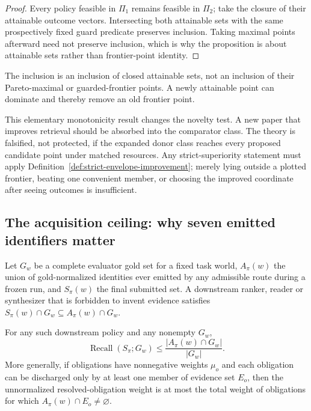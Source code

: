 \begin{proof}
Every policy feasible in $\Pi_1$ remains feasible in $\Pi_2$; take the closure
of their attainable outcome vectors. Intersecting both attainable sets with the
same prospectively fixed guard predicate preserves inclusion. Taking maximal
points afterward need not preserve inclusion, which is why the proposition is
about attainable sets rather than frontier-point identity.
\end{proof}

The inclusion is an inclusion of closed attainable sets, not an inclusion of
their Pareto-maximal or guarded-frontier points. A newly attainable point can
dominate and thereby remove an old frontier point.

This elementary monotonicity result changes the novelty test.  A new paper that
improves retrieval should be absorbed into the comparator class.  The theory is
falsified, not protected, if the expanded donor class reaches every proposed
candidate point under matched resources. Any strict-superiority statement must
apply Definition~\ref{def:strict-envelope-improvement}; merely lying outside a
plotted frontier, beating one convenient member, or choosing the improved
coordinate after seeing outcomes is insufficient.

\subsection{The acquisition ceiling: why seven emitted identifiers matter}

Let $G_w$ be a complete evaluator gold set for a fixed task world, $A_\pi(w)$
the union of gold-normalized identities ever emitted by any admissible route
during a frozen run, and $S_\pi(w)$ the final submitted set.  A downstream
ranker, reader or synthesizer that is forbidden to invent evidence satisfies
$S_\pi(w)\cap G_w\subseteq A_\pi(w)\cap G_w$.

\begin{theorem}
\label{thm:acquisition-ceiling}
For any such downstream policy and any nonempty $G_w$,
\[
 \operatorname{Recall}(S_\pi;G_w)
 \leq \frac{|A_\pi(w)\cap G_w|}{|G_w|}.
\]
More generally, if obligations have nonnegative weights $\mu_o$ and each
obligation can be discharged only by at least one member of evidence set $E_o$,
then the unnormalized resolved-obligation weight is at most the total weight of
obligations for which $A_\pi(w)\cap E_o\ne\varnothing$.
\end{theorem}

